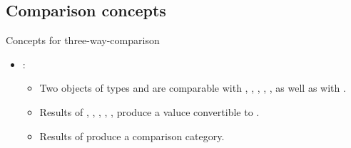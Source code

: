 \subsection{Comparison concepts}

\begin{frame}[t,fragile]{Concepts for three-way-comparison}
\begin{itemize}
  \item {}:
    \begin{itemize}
      \item Two objects of types  and  are comparable with
            \cppkey{==}, \cppkey{!=}, \cppkey{<}, \cppkey{<=}, \cppkey{>}, \cppkey{>=}
            as well as with \cppkey{<=>}.
      \item Results of
            \cppkey{==}, \cppkey{!=}, \cppkey{<}, \cppkey{<=}, \cppkey{>}, \cppkey{>=}
            produce a valuce convertible to .
      \item Results of \cppkey{<=>} produce a comparison category.
    \end{itemize}
\end{itemize}
\end{frame}
